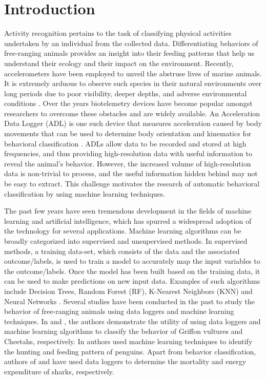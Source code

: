 \documentclass[conference]{IEEEtran}
\begin{document}
\section{Introduction}
Activity recognition pertains to the task of classifying physical activities undertaken by an individual from the collected data. Differentiating behaviors of free-ranging animals provides an insight into their feeding patterns that help us understand their ecology and their impact on the environment. Recently, accelerometers have been employed to unveil the abstruse lives of marine animals.   It is extremely arduous to observe such species in their natural environments over long periods due to poor visibility, deeper depths, and adverse environmental conditions \cite{1}. Over the years biotelemetry devices have become popular amongst researchers to overcome these obstacles and are widely available. An Acceleration Data Logger (ADL) is one such device that measures acceleration caused by body movements that can be used to determine body orientation and kinematics for behavioral classification \cite{1}. ADLs allow data to be recorded and stored at high frequencies, and thus providing high-resolution data with useful information to reveal the animal’s behavior. However, the increased   volume of high-resolution data is non-trivial to process, and the useful information hidden behind may not be easy to extract. This challenge motivates the research of automatic behavioral classification by using machine learning techniques.

The past few years have seen tremendous development in the fields of machine learning and artificial intelligence, which has spurred a widespread adoption of the technology for several applications. Machine learning algorithms can be broadly categorized into supervised and unsupervised methods. In supervised methods, a training data-set, which consists of the data and the associated outcome/labels, is used to train a model to accurately map the input variables to the outcome/labels. Once the model has been built based on the training data, it can be used to make predictions on new input data. Examples of such algorithms include Decision Trees, Random Forest (RF), K-Nearest Neighbors (KNN) and Neural Networks \cite{1}. 
Several studies have been conducted in the past to study the behavior of free-ranging animals using data loggers and machine learning techniques. In  \cite{2} and  \cite{3}, the authors demonstrate the utility of using data loggers and machine learning algorithms to classify the behavior of Griffon vultures and Cheetahs, respectively. In  \cite{4} authors used machine learning techniques to identify the hunting and feeding pattern of penguins. Apart from behavior classification, authors of  \cite{5} and  \cite{6} have used data loggers to determine the mortality and energy expenditure of sharks, respectively.
\end{document}
